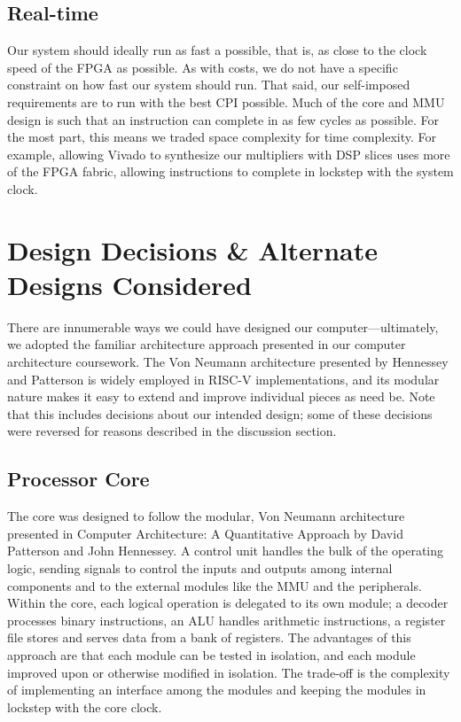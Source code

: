 \documentclass{article}
\begin{document}
\subsection{Real-time}
Our system should ideally run as fast a possible, that is, as close to the clock speed of the FPGA as possible. As with costs, we do not have a specific constraint on how fast our system should run.  That said, our self-imposed requirements are to run with the best CPI possible.  Much of the core and MMU design is such that an instruction can complete in as few cycles as possible.  For the most part, this means we traded space complexity for time complexity. For example, allowing Vivado to synthesize our multipliers with DSP slices uses more of the FPGA fabric, allowing instructions to complete in lockstep with the system clock.

\section{Design Decisions \& Alternate Designs Considered}

There are innumerable ways we could have designed our computer---ultimately, we adopted the familiar architecture approach presented in our computer architecture coursework.  The Von Neumann architecture presented by Hennessey and Patterson is widely employed in RISC-V implementations, and its modular nature makes it easy to extend and improve individual pieces as need be.  Note that this includes decisions about our intended design; some of these decisions were reversed for reasons described in the discussion section.

\subsection{Processor Core}
The core was designed to follow the modular, Von Neumann architecture presented in Computer Architecture: A Quantitative Approach by David Patterson and John Hennessey.  A control unit handles the bulk of the operating logic, sending signals to control the inputs and outputs among internal components and to the external modules like the MMU and the peripherals.  Within the core, each logical operation is delegated to its own module; a decoder processes binary instructions, an ALU handles arithmetic instructions, a register file stores and serves data from a bank of registers.  The advantages of this approach are that each module can be tested in isolation, and each module improved upon or otherwise modified in isolation.  The trade-off is the complexity of implementing an interface among the modules and keeping the modules in lockstep with the core clock.
\end{document}
